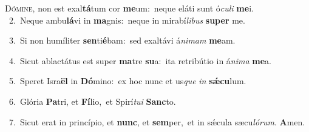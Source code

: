\lettrine{\initial\textcolor{\initialcolor}{D}}{ómine,} non est exal\-\textbf{tá}\-tum cor \textbf{me}\-um:~\star neque eláti sunt ó\-\textit{cu}\-\textit{li} \textbf{me}\-i.\\
{\numbfont\textcolor{\numbcolor}{~2.}}~Neque ambu\-\textbf{lá}\-vi in \textbf{ma}\-gnis:~\star neque in mirabí\-\textit{li}\-\textit{bus} \textbf{su}\-\textbf{per} me.\par
{\numbfont\textcolor{\numbcolor}{~3.}}~Si non humíliter \textbf{sen}\-ti\-\textbf{é}\-bam:~\star sed exaltávi á\-\textit{ni}\-\textit{mam} \textbf{me}\-am.\par
{\numbfont\textcolor{\numbcolor}{~4.}}~Sicut ablactátus est super \textbf{ma}\-tre \textbf{su}\-a:~\star ita retribútio in á\-\textit{ni}\-\textit{ma} \textbf{me}\-a.\par
{\numbfont\textcolor{\numbcolor}{~5.}}~Speret Isra\textbf{ël} in \textbf{Dó}\-mino:~\star ex hoc nunc et us\textit{que} \textit{in} \textbf{sǽ}\-\textbf{cu}lum.\par
{\numbfont\textcolor{\numbcolor}{~6.}}~Glória \textbf{Pa}\-tri, et \textbf{Fí}\-lio,~\star et Spirí\-\textit{tu}\-\textit{i} \textbf{Sanc}\-to.\par
{\numbfont\textcolor{\numbcolor}{~7.}}~Sicut erat in princípio, et \textbf{nunc}\-, et \textbf{sem}\-per,~\star et in sǽcula sæcu\-\textit{ló}\-\textit{rum}. \textbf{A}\-men.\par
